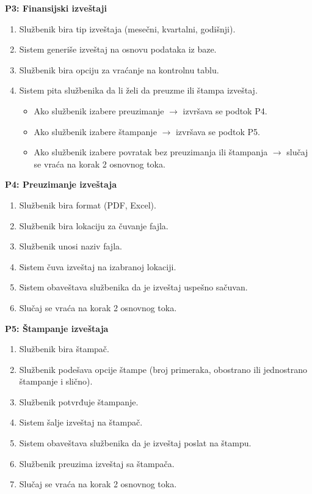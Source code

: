 \textbf{P3: Finansijski izveštaji}
\begin{enumerate}
    \item Službenik bira tip izveštaja (mesečni, kvartalni, godišnji).
    \item Sistem generiše izveštaj na osnovu podataka iz baze.
    \item Službenik bira opciju za vraćanje na kontrolnu tablu.
    \item Sistem pita službenika da li želi da preuzme ili štampa izveštaj.
    \begin{itemize}
        \item Ako službenik izabere preuzimanje $\rightarrow$ izvršava se podtok P4.
        \item Ako službenik izabere štampanje $\rightarrow$ izvršava se podtok P5.
        \item Ako službenik izabere povratak bez preuzimanja ili štampanja $\rightarrow$ slučaj se vraća na korak 2 osnovnog toka.
    \end{itemize}
\end{enumerate}

\textbf{P4: Preuzimanje izveštaja}
\begin{enumerate}
    \item Službenik bira format (PDF, Excel).
    \item Službenik bira lokaciju za čuvanje fajla.
    \item Službenik unosi naziv fajla.
    \item Sistem čuva izveštaj na izabranoj lokaciji.
    \item Sistem obaveštava službenika da je izveštaj uspešno sačuvan.
    \item Slučaj se vraća na korak 2 osnovnog toka.
\end{enumerate}

\textbf{P5: Štampanje izveštaja}
\begin{enumerate}
    \item Službenik bira štampač.
    \item Službenik podešava opcije štampe (broj primeraka, obostrano ili jednostrano štampanje i slično).
    \item Službenik potvrđuje štampanje.
    \item Sistem šalje izveštaj na štampač.
    \item Sistem obaveštava službenika da je izveštaj poslat na štampu.
    \item Službenik preuzima izveštaj sa štampača.
    \item Slučaj se vraća na korak 2 osnovnog toka.
\end{enumerate}

